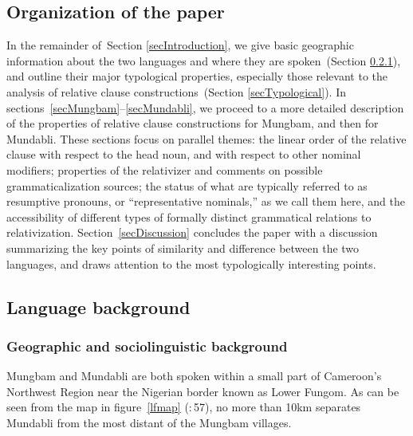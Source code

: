 \documentclass[10pt,twoside]{article}
\newcommand{\citepp}[2]{(\citealp{#1}:\,{#2})}
\newcommand{\sref}[1]{Section \ref{#1}}
\begin{document}
\subsection{Organization of the paper}
%
In the remainder of~\sref{secIntroduction},
we give basic geographic information about the two languages
and where they are spoken~(\sref{secGeographic}),
and outline their major typological properties,
especially those relevant to the analysis of relative clause
constructions~(\sref{secTypological}).
%
In sections~\ref{secMungbam}--\ref{secMundabli}, we proceed to
a more detailed description of the properties of relative clause constructions
for Mungbam, and then for Mundabli. 
These sections focus on
parallel themes: the linear order of the relative clause with respect
to the head noun, and with respect to other nominal modifiers;
properties of the relativizer and comments on possible grammaticalization sources;
the status of what are typically referred to as resumptive pronouns, 
or ``representative nominals,'' as we call them here, and
the accessibility of different types of formally distinct grammatical
%
%
relations to relativization.\footnotemark\/
%
%
Section~\ref{secDiscussion}
concludes the paper with a discussion summarizing the key points of
similarity and difference between the two languages, and draws attention
to the most typologically interesting points.
%
\subsection{Language background}\label{secLanguageBackground}
%

\subsubsection{Geographic and sociolinguistic background}\label{secGeographic}
%

Mungbam and Mundabli are both spoken within a small part of Cameroon's
Northwest Region near the Nigerian border known as Lower Fungom. As can be seen from the map
in figure~\ref{lfmap} \citepp{dicarlo:2011}{57}, no more than 10km separates
Mundabli from the most distant of the Mungbam villages. 
\end{document}
